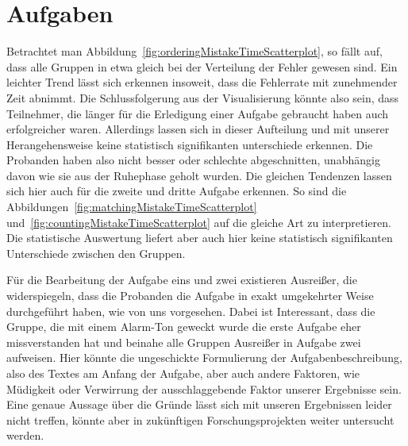 \section{Aufgaben}

Betrachtet man Abbildung~\ref{fig:orderingMistakeTimeScatterplot}, so fällt auf, dass alle Gruppen in etwa gleich bei der Verteilung der Fehler gewesen sind. 
Ein leichter Trend lässt sich erkennen insoweit, dass die Fehlerrate mit zunehmender Zeit abnimmt. 
Die Schlussfolgerung aus der Visualisierung könnte also sein, dass Teilnehmer, die länger für die Erledigung einer Aufgabe gebraucht haben auch erfolgreicher waren. Allerdings lassen sich in dieser Aufteilung und mit unserer Herangehensweise keine statistisch signifikanten unterschiede erkennen. 
Die Probanden haben also nicht besser oder schlechte abgeschnitten, unabhängig davon wie sie aus der Ruhephase geholt wurden. 
Die gleichen Tendenzen lassen sich hier auch für die zweite und dritte Aufgabe erkennen. So sind die Abbildungen~\ref{fig:matchingMistakeTimeScatterplot} und~\ref{fig:countingMistakeTimeScatterplot} auf die gleiche Art zu interpretieren.
Die statistische Auswertung liefert aber auch hier keine statistisch signifikanten Unterschiede zwischen den Gruppen.

Für die Bearbeitung der Aufgabe eins und zwei existieren Ausreißer, die widerspiegeln, dass die Probanden die Aufgabe in exakt umgekehrter Weise durchgeführt haben, wie von uns vorgesehen. 
Dabei ist Interessant, dass die Gruppe, die mit einem Alarm-Ton geweckt wurde die erste Aufgabe eher missverstanden hat und beinahe alle Gruppen Ausreißer in Aufgabe zwei aufweisen.
Hier könnte die ungeschickte Formulierung der Aufgabenbeschreibung, also des Textes am Anfang der Aufgabe, aber auch andere Faktoren, wie Müdigkeit oder Verwirrung der ausschlaggebende Faktor unserer Ergebnisse sein. 
Eine genaue Aussage über die Gründe lässt sich mit unseren Ergebnissen leider nicht treffen, könnte aber in zukünftigen Forschungsprojekten weiter untersucht werden.

